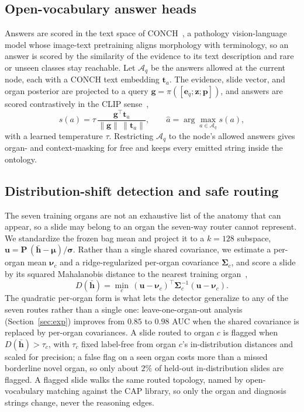 \documentclass[runningheads]{llncs}
\begin{document}
\subsection{Open-vocabulary answer heads}
Answers are scored in the text space of CONCH~\cite{conch}, a pathology vision-language model whose image-text
pretraining aligns morphology with terminology, so an answer is scored by the similarity of the evidence to its
text description and rare or unseen classes stay reachable. Let
$\mathcal{A}_q$ be the answers allowed at the current node, each with a CONCH text embedding $\mathbf{t}_a$. The
evidence, slide vector, and organ posterior are projected to a query
$\mathbf{g}=\pi([\mathbf{e}_q;\mathbf{z};\mathbf{p}])$, and answers are scored contrastively in the CLIP
sense~\cite{clip},
\begin{equation}
s(a)=\tau\,\frac{\mathbf{g}^{\!\top}\mathbf{t}_a}{\lVert\mathbf{g}\rVert\,\lVert\mathbf{t}_a\rVert},
\qquad \hat a=\arg\max_{a\in\mathcal{A}_q}s(a),
\end{equation}
with a learned temperature $\tau$. Restricting $\mathcal{A}_q$ to the node's allowed answers gives organ- and
context-masking for free and keeps every emitted string inside the ontology.

\subsection{Distribution-shift detection and safe routing}
\label{sec:ood}
The seven training organs are not an exhaustive list of the anatomy that can appear, so a slide may belong to an
organ the seven-way router cannot represent. We standardize the frozen bag mean and project it to a $k{=}128$ subspace,
$\mathbf{u}=\mathbf{P}\,(\bar{\mathbf{h}}-\boldsymbol{\mu})/\boldsymbol{\sigma}$. Rather than a single shared
covariance, we estimate a per-organ mean $\boldsymbol{\nu}_c$ and a ridge-regularized per-organ covariance
$\boldsymbol{\Sigma}_c$, and score a slide by its squared Mahalanobis distance to the nearest training
organ~\cite{mahalanobis},
\begin{equation}
D(\bar{\mathbf{h}})=\min_{c}\,(\mathbf{u}-\boldsymbol{\nu}_c)^{\!\top}\boldsymbol{\Sigma}_c^{-1}(\mathbf{u}-\boldsymbol{\nu}_c).
\end{equation}
The quadratic per-organ form is what lets the detector generalize to any of the seven routes rather than a
single one: leave-one-organ-out analysis (Section~\ref{sec:exp}) improves from $0.85$ to $0.98$ AUC when the
shared covariance is replaced by per-organ covariances. A slide routed to organ $c$ is flagged when
$D(\bar{\mathbf{h}})>\tau_c$, with $\tau_c$ fixed label-free from organ $c$'s in-distribution distances and scaled
for precision; a false flag on a seen organ costs more than a missed borderline novel organ, so only about $2\%$
of held-out in-distribution slides are flagged. A flagged slide walks the same routed topology, named by
open-vocabulary matching against the CAP library, so only the organ and diagnosis strings change, never the
reasoning edges.
\end{document}
